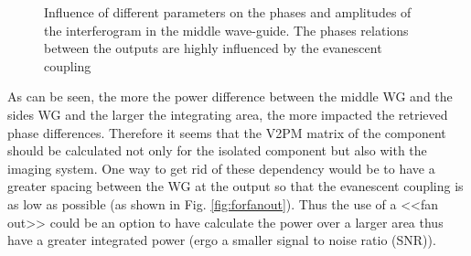 \begin{figure}[htbp]
\begin{minipage}[b]{.33\textwidth}
  \end{minipage}
  \caption{Influence of different parameters on the phases and
    amplitudes of the interferogram in the middle wave-guide. The phases relations between the outputs are highly influenced by the evanescent coupling}
  \label{fig:phase_influence}
\end{figure}

As can be seen, the more the power difference between the middle WG
and the sides WG and the larger the integrating area, the more
impacted the retrieved phase differences. Therefore it seems that the V2PM matrix of the component should be calculated not only for the isolated component but also with the imaging system. One way to get rid of these dependency would be to have a greater spacing between the WG at the output so that the evanescent coupling is as low as possible (as shown in Fig. \ref{fig:forfanout}). Thus the use of a
<<fan out>> could be an option to have calculate the power over a larger area thus have  a greater integrated power
(ergo a smaller signal to noise ratio (SNR)).
